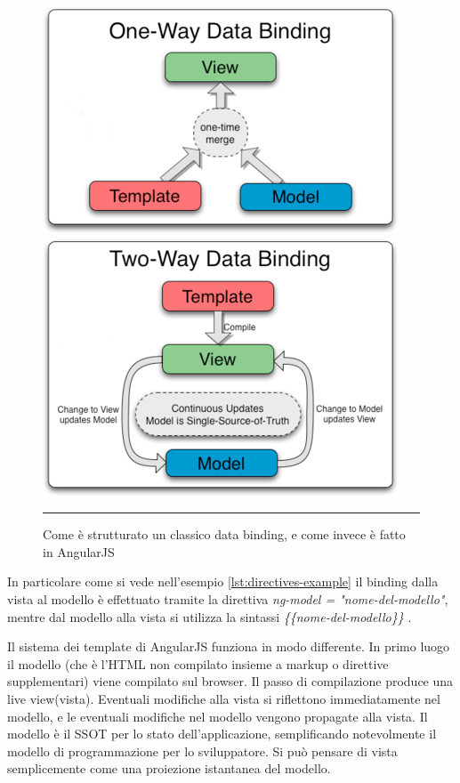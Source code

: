 \begin{description}
\begin{figure}[htbp]
  \centering
    \includegraphics[scale=0.5]{Figures/one-way-data-binding.png} 
    \includegraphics[scale=0.5]{Figures/two-way-data-binding.png} 
    \rule{35em}{0.5pt}
  \caption[Data Bindings]{Come è strutturato un classico data binding, e come invece è fatto in AngularJS}
  \label{fig:Data Binding}
\end{figure}

In particolare come si vede nell'esempio \ref{lst:directives-example} il binding dalla vista al modello è effettuato tramite la direttiva \emph{ng-model = "nome-del-modello"}, mentre dal modello alla vista si utilizza la sintassi \emph{ \{\{nome-del-modello\}\} }.

Il sistema dei template di AngularJS funziona in modo differente. In primo luogo il modello (che è l'HTML non compilato insieme a  markup o direttive supplementari) viene compilato sul browser. Il passo di compilazione produce una live view(vista). Eventuali modifiche alla vista si riflettono immediatamente nel modello, e le eventuali modifiche nel modello vengono propagate alla vista. Il modello è il SSOT per lo stato dell'applicazione, semplificando notevolmente il modello di programmazione per lo sviluppatore. Si può pensare di vista semplicemente come una proiezione istantanea del modello.


\end{description}
